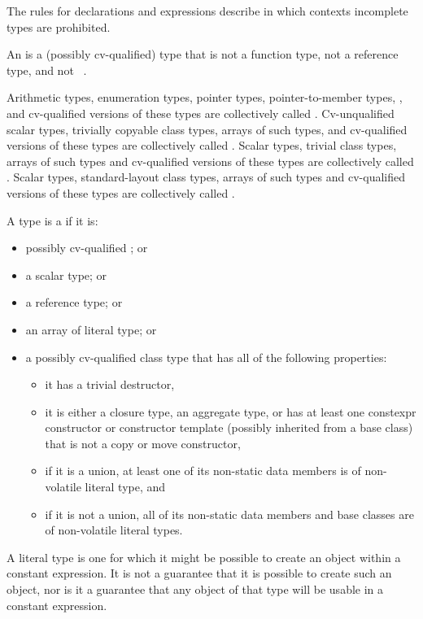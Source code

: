 \pnum
\begin{note} The rules for declarations and expressions describe in which
contexts incomplete types are prohibited. \end{note}

\pnum
An  is a (possibly cv-qualified) type that is not
a function type, not a reference type, and not \cv{}~.

\pnum
Arithmetic types, enumeration types, pointer
types, pointer-to-member types,
,
and
cv-qualified versions of these
types are collectively called
.
Cv-unqualified scalar types, trivially copyable class types, arrays of
such types, and cv-qualified versions of these
types are collectively called .
Scalar types, trivial class types,
arrays of such types and cv-qualified versions of these
types are collectively called
. Scalar types, standard-layout class
types, arrays of such types and
cv-qualified versions of these types
are collectively called .

\pnum
A type is a  if it is:
\begin{itemize}
\item possibly cv-qualified ; or
\item a scalar type; or
\item a reference type; or
\item an array of literal type; or
\item a possibly cv-qualified class type that
has all of the following properties:
\begin{itemize}
\item it has a trivial destructor,
\item it is either a closure type,
an aggregate type, or
has at least one constexpr constructor or constructor template
(possibly inherited from a base class)
that is not a copy or move constructor,
\item if it is a union, at least one of its non-static data members is
of non-volatile literal type, and
\item if it is not a union, all of its non-static data members and base classes are
of non-volatile literal types.
\end{itemize}
\end{itemize}
\begin{note}
A literal type is one for which
it might be possible to create an object
within a constant expression.
It is not a guarantee that it is possible to create such an object,
nor is it a guarantee that any object of that type
will be usable in a constant expression.
\end{note}

